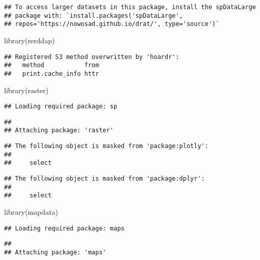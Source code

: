 \documentclass[]{tufte-handout}
\newenvironment{Shaded}{}{}
\newcommand{\FunctionTok}[1]{\textcolor[rgb]{0.02,0.16,0.49}{#1}}
\newcommand{\NormalTok}[1]{#1}
\begin{document}
\begin{verbatim}
## To access larger datasets in this package, install the spDataLarge
## package with: `install.packages('spDataLarge',
## repos='https://nowosad.github.io/drat/', type='source')`
\end{verbatim}

\begin{Shaded}
\begin{Highlighting}[]
\FunctionTok{library}\NormalTok{(rerddap)}
\end{Highlighting}
\end{Shaded}

\begin{verbatim}
## Registered S3 method overwritten by 'hoardr':
##   method           from
##   print.cache_info httr
\end{verbatim}

\begin{Shaded}
\begin{Highlighting}[]
\FunctionTok{library}\NormalTok{(raster)}
\end{Highlighting}
\end{Shaded}

\begin{verbatim}
## Loading required package: sp
\end{verbatim}

\begin{verbatim}
## 
## Attaching package: 'raster'
\end{verbatim}

\begin{verbatim}
## The following object is masked from 'package:plotly':
## 
##     select
\end{verbatim}

\begin{verbatim}
## The following object is masked from 'package:dplyr':
## 
##     select
\end{verbatim}

\begin{Shaded}
\begin{Highlighting}[]
\FunctionTok{library}\NormalTok{(mapdata)}
\end{Highlighting}
\end{Shaded}

\begin{verbatim}
## Loading required package: maps
\end{verbatim}

\begin{verbatim}
## 
## Attaching package: 'maps'
\end{verbatim}
\end{document}
